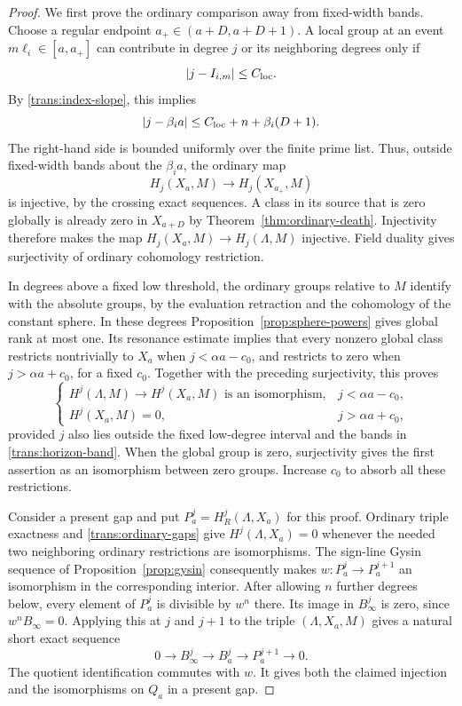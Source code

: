 \begin{proof}
We first prove the ordinary comparison away from fixed-width bands.
Choose a regular endpoint $a_+\in(a+D,a+D+1)$.
A local group at an event $m\ell_i\in[a,a_+]$ can contribute in
degree $j$ or its neighboring degrees only if
\[
 |j-I_{i,m}|\le C_{\rm loc}.
\]
By \eqref{trans:index-slope}, this implies
\begin{equation}\label{trans:horizon-band}
 |j-\beta_i a|
 \le C_{\rm loc}+n+\beta_i(D+1).
\end{equation}
The right-hand side is bounded uniformly over the finite prime list.
Thus, outside fixed-width bands about the $\beta_i a$, the ordinary
map
\[
 H_j(X_a,M)\longrightarrow H_j(X_{a_+},M)
\]
is injective, by the crossing exact sequences.  A class in its source
that is zero globally is already zero in $X_{a+D}$ by
Theorem~\ref{thm:ordinary-death}.  Injectivity therefore makes the
map $H_j(X_a,M)\to H_j(\Lambda,M)$ injective.  Field duality gives
surjectivity of ordinary cohomology restriction.

In degrees above a fixed low threshold, the ordinary groups relative
to $M$ identify with the absolute groups, by the evaluation retraction
and the cohomology of the constant sphere.  In these degrees
Proposition~\ref{prop:sphere-powers} gives global rank at most one.
Its resonance estimate implies that every nonzero global class
restricts nontrivially to $X_a$ when $j<\alpha a-c_0$, and restricts
to zero when $j>\alpha a+c_0$, for a fixed $c_0$.
Together with the preceding surjectivity, this proves
\begin{equation}\label{trans:ordinary-gaps}
 \begin{cases}
 H^j(\Lambda,M)\longrightarrow H^j(X_a,M)
       \text{ is an isomorphism},&j<\alpha a-c_0,\\
 H^j(X_a,M)=0,&j>\alpha a+c_0,
 \end{cases}
\end{equation}
provided $j$ also lies outside the fixed low-degree interval and the
bands in \eqref{trans:horizon-band}.  When the global group is zero,
surjectivity gives the first assertion as an isomorphism between zero
groups.  Increase $c_0$ to absorb all these restrictions.

Consider a present gap and put
$P_a^j=H_R^j(\Lambda,X_a)$ for this proof.
Ordinary triple exactness and \eqref{trans:ordinary-gaps} give
$H^j(\Lambda,X_a)=0$ whenever the needed two neighboring ordinary
restrictions are isomorphisms.  The sign-line Gysin sequence of
Proposition~\ref{prop:gysin} consequently makes
$w:P_a^j\to P_a^{j+1}$ an isomorphism in the corresponding interior.
After allowing $n$ further degrees below, every element of $P_a^j$
is divisible by $w^n$ there.  Its image in $B_\infty^j$ is zero,
since $w^nB_\infty=0$.  Applying this at $j$ and $j+1$ to the triple
$(\Lambda,X_a,M)$ gives a natural short exact sequence
\begin{equation}\label{trans:present-sequence}
 0\longrightarrow B_\infty^j\longrightarrow B_a^j
   \longrightarrow P_a^{j+1}\longrightarrow0.
\end{equation}
The quotient identification commutes with $w$.  It gives both the
claimed injection and the isomorphisms on $Q_a$ in a present gap.


\end{proof}
